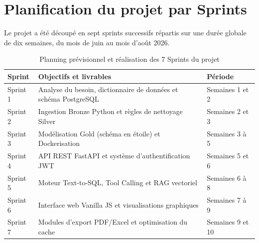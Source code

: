 \documentclass[a4paper,12pt]{report}
\begin{document}
\section{Planification du projet par Sprints}
\begin{doublespace}
Le projet a été découpé en sept sprints successifs répartis sur une durée globale de dix semaines, du mois de juin au mois d'août 2026.

\begin{table}[H]
\centering
\begin{tabular}{|p{2.5cm}|p{7.5cm}|p{3.5cm}|}
    \hline
    \textbf{Sprint} & \textbf{Objectifs et livrables} & \textbf{Période} \\
    \hline
    Sprint 1 & Analyse du besoin, dictionnaire de données et schéma PostgreSQL & Semaines 1 et 2 \\
    \hline
    Sprint 2 & Ingestion Bronze Python et règles de nettoyage Silver & Semaines 2 et 3 \\
    \hline
    Sprint 3 & Modélisation Gold (schéma en étoile) et Dockerisation & Semaines 3 à 5 \\
    \hline
    Sprint 4 & API REST FastAPI et système d'authentification JWT & Semaines 5 et 6 \\
    \hline
    Sprint 5 & Moteur Text-to-SQL, Tool Calling et RAG vectoriel & Semaines 6 à 8 \\
    \hline
    Sprint 6 & Interface web Vanilla JS et visualisations graphiques & Semaines 7 à 9 \\
    \hline
    Sprint 7 & Modules d'export PDF/Excel et optimisation du cache & Semaines 9 et 10 \\
    \hline
\end{tabular}
\caption{Planning prévisionnel et réalisation des 7 Sprints du projet}
\label{tab:sprints_plan}
\end{table}


\end{doublespace}
\end{document}
